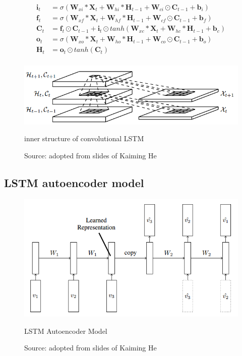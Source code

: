 \documentclass[twoside,a4paper,article]{combine}
\begin{document}
\begin{align*}
    \mathbf{i}_t &= \sigma(\mathbf{W}_{xi} \ast \mathbf{X}_t + 
                        \mathbf{W}_{hi} \ast \mathbf{H}_{t-1} + \mathbf{W}_{ci} \odot \mathbf{C}_{t-1}+ \mathbf{b}_i) \\
    \mathbf{f}_t &= \sigma(\mathbf{W}_{xf} \ast \mathbf{X}_t + 
                        \mathbf{W}_{hf} \ast \mathbf{H}_{t-1} + \mathbf{W}_{cf} \odot \mathbf{C}_{t-1}+ \mathbf{b}_f) \\
    \mathbf{C}_t &= \mathbf{f}_t \odot \mathbf{C}_{t-1} + \mathbf{i}_t \odot tanh(\mathbf{W}_{xc} \ast \mathbf{X}_t +
                        \mathbf{W}_{hc} \ast \mathbf{H}_{t-1} + \mathbf{b}_c) \\
    \mathbf{o}_t &= \sigma(\mathbf{W}_{xo}\ast\mathbf{X}_t + 
                        \mathbf{W}_{ho}\ast\mathbf{H}_{t-1} + \mathbf{W}_{co}\odot\mathbf{C}_{t-1}+ \mathbf{b}_o) \\
    \mathbf{H}_t &= \mathbf{o}_t \odot tanh(\mathbf{C}_t) \\
\end{align*}


\begin{figure}[ht!]
    \includegraphics[width=\linewidth]{convlstm}
    \caption{inner structure of convolutional LSTM}
    \caption*{Source: adopted from slides of Kaiming He}
    \label{fig:convlstm}
\end{figure}

\subsection{LSTM autoencoder model}
\begin{figure}[ht!]
    \includegraphics[width=\linewidth]{autoencoder}
    \caption{LSTM Autoencoder Model}
    \caption*{Source: adopted from slides of Kaiming He}
    \label{fig:encoder}
\end{figure}
\end{document}
